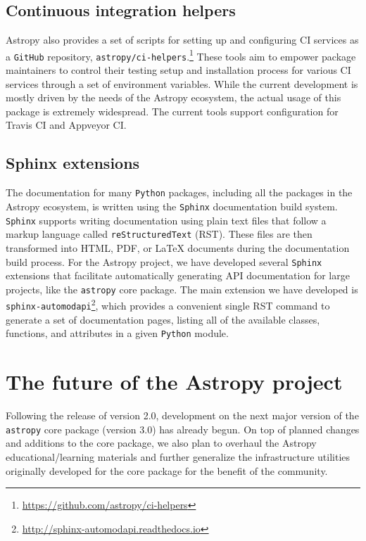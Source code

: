 \documentclass[modern]{aastex61}
\newcommand{\package}[1]{\texttt{#1}\xspace}
\newcommand{\github}{\package{GitHub}}
\newcommand{\python}{\package{Python}}
\newcommand{\astropy}{Astropy\xspace}
\newcommand{\astropypkg}{\package{astropy}}
\begin{document}
\subsection{Continuous integration helpers}

\astropy also provides a set of scripts for setting up and configuring
CI services as a \github repository,
\package{astropy/ci-helpers}.\footnote{\url{https://github.com/astropy/ci-helpers}}
These tools aim to empower package maintainers to control their testing setup
and installation process for various CI services through a
set of environment variables.
While the current development is mostly driven by the needs of the \astropy
ecosystem, the actual usage of this package is extremely widespread. The current
tools support configuration for Travis CI and Appveyor CI.

\subsection{Sphinx extensions}

The documentation for many \python packages, including
all the packages in the \astropy ecosystem, is written using the
\package{Sphinx} documentation build system.
\package{Sphinx} supports writing documentation using plain text files
that follow a markup language called \texttt{reStructuredText} (RST).
These files are then transformed into HTML, PDF, or \LaTeX{} documents
during the documentation build process.
For the \astropy project, we have developed several \package{Sphinx} extensions
that facilitate automatically generating API documentation for large projects,
like the \astropypkg core package.
The main extension we have developed is
\package{sphinx-automodapi}\footnote{\url{http://sphinx-automodapi.readthedocs.io}},
which provides a convenient single RST command to generate a set of
documentation pages, listing all of the available classes, functions, and
attributes in a given \python module.

\section{The future of the Astropy project}
\label{sec:future}

Following the release of version 2.0, development on the next major version of
the \astropypkg core package (version 3.0) has already begun.
On top of planned changes and additions to the core package, we also plan to
overhaul the \astropy educational/learning materials and further
generalize the infrastructure utilities originally developed for the core
package for the benefit of the community.
\end{document}
